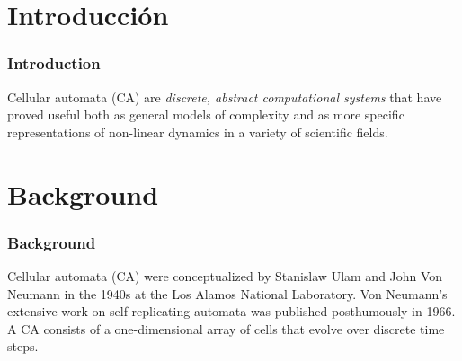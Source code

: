 \documentclass{beamer}
\begin{document}
\section{Introducción}
\begin{frame}
    \frametitle{Introduction}
    Cellular automata (CA) are \textit{discrete, abstract computational systems} that have proved useful both as general models of complexity and as more specific representations of non-linear dynamics in a variety of scientific fields.
\end{frame}

\section{Background}
\begin{frame}
    \frametitle{Background}
    Cellular automata (CA) were conceptualized by Stanislaw Ulam and John Von Neumann in the 1940s at the Los Alamos National Laboratory. Von Neumann's extensive work on self-replicating automata was published posthumously in 1966. A CA consists of a one-dimensional array of cells that evolve over discrete time steps.
\end{frame}
\end{document}
